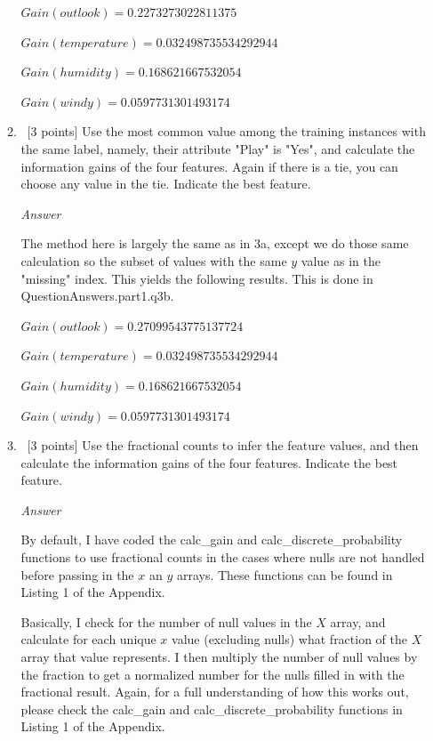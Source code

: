 \documentclass[12pt, fullpage,letterpaper]{article}
\begin{document}
\begin{enumerate}
\begin{enumerate}
\vspace{5mm}

$Gain(outlook)=0.2273273022811375$

$Gain(temperature)=0.032498735534292944$

$Gain(humidity)=0.168621667532054$

$Gain(windy)=0.0597731301493174$

\item~[3 points] Use the most common value among the  training instances with the same label, namely, their attribute "Play" is "Yes", and calculate the information gains of the four features. Again if there is a tie, you can choose any value in the tie. Indicate the best feature.

\emph{Answer}

The method here is largely the same as in 3a, except we do those same calculation so the subset of values with the same $y$ value as in the "missing" index. This yields the following results. This is done in QuestionAnswers.part1.q3b.

\vspace{5mm}

$Gain(outlook)=0.27099543775137724$

$Gain(temperature)=0.032498735534292944$

$Gain(humidity)=0.168621667532054$

$Gain(windy)=0.0597731301493174$

\item~[3 points] Use the fractional counts to infer the feature values, and then calculate the information gains of the four features. Indicate the best feature.

\emph{Answer}

By default, I have coded the calc\_gain and calc\_discrete\_probability functions to use fractional counts in the cases where nulls are not handled before passing in the $x$ an $y$ arrays. These functions can be found in Listing 1 of the Appendix. 

\vspace{5mm}

Basically, I check for the number of null values in the $X$ array, and calculate for each unique $x$ value (excluding nulls) what fraction of the $X$ array that value represents. I then multiply the number of null values by the fraction to get a normalized number for the nulls filled in with the fractional result. Again, for a full understanding of how this works out, please check the calc\_gain and calc\_discrete\_probability functions  in Listing 1 of the Appendix.


\end{enumerate}
\end{enumerate}
\end{document}
